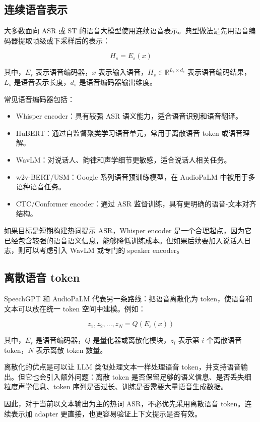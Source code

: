 \documentclass[UTF8,fontset=fandol]{ctexart}
\begin{document}
\subsection{连续语音表示}

大多数面向 ASR 或 ST 的语音大模型使用连续语音表示。典型做法是先用语音编码器提取帧级或下采样后的表示：

$$
H_s = E_s(x)
$$

其中，$E_s$ 表示语音编码器，$x$ 表示输入语音，$H_s \in \mathbb{R}^{L_s \times d_s}$ 表示语音编码结果，$L_s$ 是语音表示长度，$d_s$ 是语音编码器输出维度。

常见语音编码器包括：

\begin{itemize}
  \item Whisper encoder：具有较强 ASR 语义能力，适合语音识别和语音翻译。
  \item HuBERT：通过自监督聚类学习语音单元，常用于离散语音 token 或语音理解。
  \item WavLM：对说话人、韵律和声学细节更敏感，适合说话人相关任务。
  \item w2v-BERT/USM：Google 系列语音预训练模型，在 AudioPaLM 中被用于多语种语音任务。
  \item CTC/Conformer encoder：通过 ASR 监督训练，具有更明确的语音-文本对齐结构。
\end{itemize}

如果目标是短期构建热词提示 ASR，Whisper encoder 是一个合理起点，因为它已经包含较强的语音语义信息，能够降低训练成本。但如果后续要加入说话人日志，则可以考虑引入 WavLM 或专门的 speaker encoder。

\subsection{离散语音 token}

SpeechGPT 和 AudioPaLM 代表另一条路线：把语音离散化为 token，使语音和文本可以放在统一 token 空间中建模。例如：

$$
z_1,z_2,\ldots,z_N = Q(E_s(x))
$$

其中，$E_s$ 是语音编码器，$Q$ 是量化器或离散化模块，$z_i$ 表示第 $i$ 个离散语音 token，$N$ 表示离散 token 数量。

离散化的优点是可以让 LLM 类似处理文本一样处理语音 token，并支持语音输出。但它也会引入额外问题：离散 token 是否保留足够的语义信息、是否丢失细粒度声学信息、token 序列是否过长、训练是否需要大量语音生成数据。

因此，对于当前以文本输出为主的热词 ASR，不必优先采用离散语音 token。连续表示加 adapter 更直接，也更容易验证上下文提示是否有效。
\end{document}
